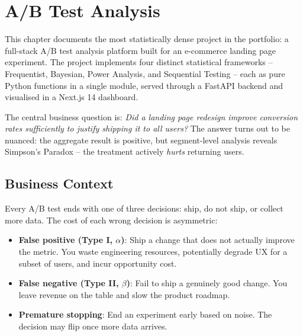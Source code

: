 
\chapter{A/B Test Analysis}
\label{ch:abtest}


This chapter documents the most statistically dense project in the portfolio: a
full-stack A/B test analysis platform built for an e-commerce landing page
experiment. The project implements four distinct statistical frameworks --
Frequentist, Bayesian, Power Analysis, and Sequential Testing -- each as pure
Python functions in a single  module, served through
a FastAPI backend and visualised in a Next.js 14 dashboard.

The central business question is: \emph{Did a landing page redesign improve
conversion rates sufficiently to justify shipping it to all users?} The answer
turns out to be nuanced: the aggregate result is positive, but segment-level
analysis reveals Simpson's Paradox -- the treatment actively \emph{hurts}
returning users.

\section{Business Context}
\label{sec:abtest-context}


Every A/B test ends with one of three decisions: ship, do not ship, or collect
more data. The cost of each wrong decision is asymmetric:

\begin{itemize}
  \item \textbf{False positive (Type I, $\alpha$)}: Ship a change that does
    not actually improve the metric. You waste engineering resources, potentially
    degrade UX for a subset of users, and incur opportunity cost.
  \item \textbf{False negative (Type II, $\beta$)}: Fail to ship a genuinely
    good change. You leave revenue on the table and slow the product roadmap.
  \item \textbf{Premature stopping}: End an experiment early based on
    noise. The decision may flip once more data arrives.
\end{itemize}

